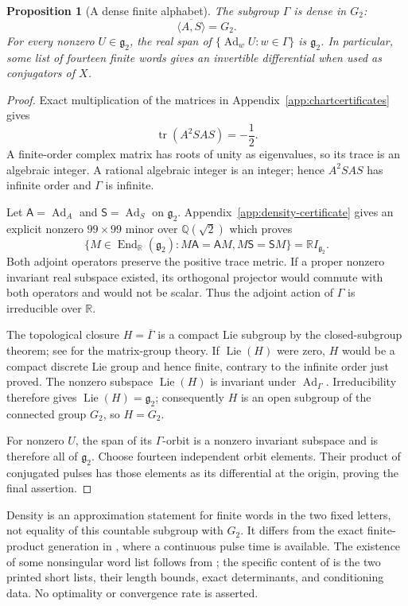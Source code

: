 \documentclass[11pt,a4paper]{article}
\newtheorem{proposition}[proposition]{Proposition}
\newcommand{\RR}{\mathbb R}
\newcommand{\Lie}{\operatorname{Lie}}
\newcommand{\Ad}{\operatorname{Ad}}
\begin{document}
\begin{proposition}[A dense finite alphabet]\label{prop:dense-alphabet}
The subgroup $\Gamma$ is dense in $G_2$:
\[
\overline{\langle A,S\rangle}=G_2.
\]
For every nonzero $U\in\mathfrak g_2$, the real span of $\{\Ad_wU:w\in\Gamma\}$ is $\mathfrak g_2$.
In particular, some list of fourteen finite words gives an invertible differential when used as conjugators of $X$.
\end{proposition}
\begin{proof}
Exact multiplication of the matrices in Appendix~\ref{app:chartcertificates} gives
\[
\operatorname{tr}(A^2SAS)=-\frac12.
\]
A finite-order complex matrix has roots of unity as eigenvalues, so its trace is an algebraic integer.
A rational algebraic integer is an integer; hence $A^2SAS$ has infinite order and $\Gamma$ is infinite.

Let $\mathsf A=\Ad_A$ and $\mathsf S=\Ad_S$ on $\mathfrak g_2$.
Appendix~\ref{app:density-certificate} gives an explicit nonzero $99\times99$ minor over $\mathbb Q(\sqrt2)$ which proves
\[
\{M\in\operatorname{End}_{\RR}(\mathfrak g_2):M\mathsf A=\mathsf AM,
 M\mathsf S=\mathsf SM\}=\RR I_{\mathfrak g_2}.
\]
Both adjoint operators preserve the positive trace metric.  If a proper nonzero invariant real subspace existed, its orthogonal projector would commute with both operators and would not be scalar.
Thus the adjoint action of $\Gamma$ is irreducible over $\RR$.

The topological closure $H=\overline\Gamma$ is a compact Lie subgroup by the closed-subgroup theorem; see \cite{Hall2000} for the matrix-group theory.
If $\Lie(H)$ were zero, $H$ would be a compact discrete Lie group and hence finite, contrary to the infinite order just proved.
The nonzero subspace $\Lie(H)$ is invariant under $\Ad_\Gamma$.
Irreducibility therefore gives $\Lie(H)=\mathfrak g_2$; consequently $H$ is an open subgroup of the connected group $G_2$, so $H=G_2$.

For nonzero $U$, the span of its $\Gamma$-orbit is a nonzero invariant subspace and is therefore all of $\mathfrak g_2$.
Choose fourteen independent orbit elements.  Their product of conjugated pulses has those elements as its differential at the origin, proving the final assertion.
\end{proof}

Density is an approximation statement for finite words in the two fixed letters, not equality of this countable subgroup with $G_2$.
It differs from the exact finite-product generation in , where a continuous pulse time is available.
The existence of some nonsingular word list follows from ; the specific content of  is the two printed short lists, their length bounds, exact determinants, and conditioning data.  No optimality or convergence rate is asserted.
\end{document}
